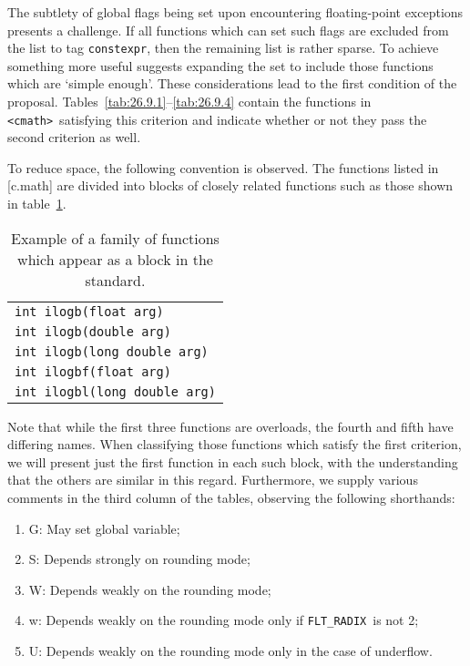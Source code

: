 \documentclass[prd,twocolumn,amsmath,amssymb,nofootinbib,eqsecnum]{revtex4-1}
\newcommand{\constexpr}{\code{constexpr}\xspace}
\newcommand{\code}[1]{{\tt #1}}
\newcommand{\header}[1]{{\tt <#1>}}
\newcommand{\cmath}{\header{cmath}}
\newcommand{\FLTRADIX}{{\tt FLT\_RADIX}}
\begin{document}
The subtlety of global flags being set upon encountering floating-point
exceptions presents a challenge. If all functions which can set such flags are
excluded from the list to tag \constexpr, then the remaining list is rather
sparse. To achieve something more useful suggests expanding the set to include
those functions which are `simple enough'. These considerations lead to the
first condition of the proposal.
Tables~\ref{tab:26.9.1}--\ref{tab:26.9.4} contain the functions in \cmath\
satisfying this criterion and indicate whether or not they pass the second criterion as well. 

To reduce space, the following convention is observed. The
functions listed in [c.math] are divided into blocks of closely related
functions such as those shown in table~\ref{tab:example}. 
\begin{table}[h]
	\begin{tabular}{l}
		\code{int ilogb(float arg)}
	\\
		\code{int ilogb(double arg)}
	\\
		\code{int ilogb(long double arg)}
	\\
		\code{int ilogbf(float arg)}
	\\
		\code{int ilogbl(long double arg)}
	\end{tabular}
\caption{Example of a family of functions which appear as a block in the standard.}
\label{tab:example}
\end{table}
Note that while the first three functions are overloads, the fourth and fifth
have differing names.  When classifying those functions which satisfy the first
criterion, we will present just the first function in each such block, with the
understanding that the others are similar in this regard. Furthermore, 
we supply various comments in the
third column of the tables, observing the following shorthands:
\begin{enumerate}
	\item G: May set global variable;
	
	\item S: Depends strongly on rounding mode;
	
	\item W: Depends weakly on the rounding mode;
	
	\item w: Depends weakly on the rounding mode only if \FLTRADIX\ is not 2;
	
	\item U: Depends weakly on the rounding mode only in the case of underflow.
\end{enumerate}
\end{document}
